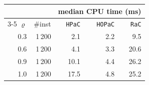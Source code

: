 \begin{tabular}{@{}rrrrr@{}}
\toprule
 &  & \multicolumn{3}{c}{median CPU time (ms)} \\
\cmidrule(l){3-5}
$\varrho$ & \#inst & \texttt{HPaC} & \texttt{HOPaC} & \texttt{RaC} \\
\midrule
0.3 & 1\,200 & 2.1 & 2.2 & 9.5 \\
0.6 & 1\,200 & 4.1 & 3.3 & 20.6 \\
0.9 & 1\,200 & 10.1 & 4.4 & 26.2 \\
1.0 & 1\,200 & 17.5 & 4.8 & 25.2 \\
\bottomrule
\end{tabular}
